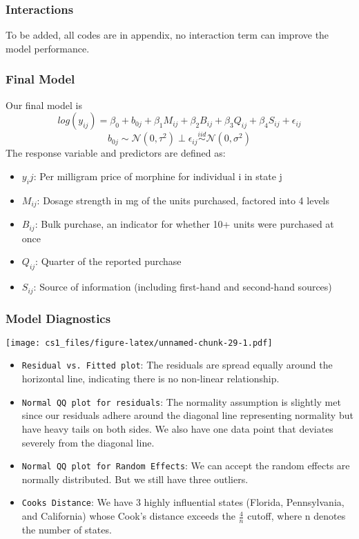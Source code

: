 \documentclass[
  11pt,
]{article}
\providecommand{\tightlist}{%
  \setlength{\itemsep}{0pt}\setlength{\parskip}{0pt}}
\begin{document}
\hypertarget{interactions}{%
\subsubsection{Interactions}\label{interactions}}

To be added, all codes are in appendix, no interaction term can improve
the model performance.

\hypertarget{final-model}{%
\subsubsection{Final Model}\label{final-model}}

Our final model is
\[log(y_{ij}) = \beta_0 + b_{0j} + \beta_1 M_{ij} + \beta_2 B_{ij} + \beta_3 Q_{ij} + \beta_4 S_{ij} + \epsilon_{ij}\]
\[b_{0j} \sim \mathcal{N}(0, \tau^2) \perp \epsilon_{ij} \stackrel{iid} \sim \mathcal{N}(0, \sigma^2)\]
The response variable and predictors are defined as:

\begin{itemize}
\item
  \(y_ij\): Per milligram price of morphine for individual i in state j
\item
  \(M_{ij}\): Dosage strength in mg of the units purchased, factored
  into 4 levels
\item
  \(B_{ij}\): Bulk purchase, an indicator for whether 10+ units were
  purchased at once
\item
  \(Q_{ij}\): Quarter of the reported purchase
\item
  \(S_{ij}\): Source of information (including first-hand and
  second-hand sources)
\end{itemize}

\hypertarget{model-diagnostics}{%
\subsubsection{Model Diagnostics}\label{model-diagnostics}}

\texttt{[image: cs1\_files/figure-latex/unnamed-chunk-29-1.pdf]}

\begin{itemize}
\tightlist
\item
  \texttt{Residual\ vs.\ Fitted\ plot}: The residuals are spread equally
  around the horizontal line, indicating there is no non-linear
  relationship.
\item
  \texttt{Normal\ QQ\ plot\ for\ residuals}: The normality assumption is
  slightly met since our residuals adhere around the diagonal line
  representing normality but have heavy tails on both sides. We also
  have one data point that deviates severely from the diagonal line.
\item
  \texttt{Normal\ QQ\ plot\ for\ Random\ Effects}: We can accept the
  random effects are normally distributed. But we still have three
  outliers.
\item
  \texttt{Cook\textquotesingle{}s\ Distance}: We have 3 highly
  influential states (Florida, Pennsylvania, and California) whose
  Cook's distance exceeds the \(\frac{4}{n}\) cutoff, where n denotes
  the number of states.
\end{itemize}
\end{document}
